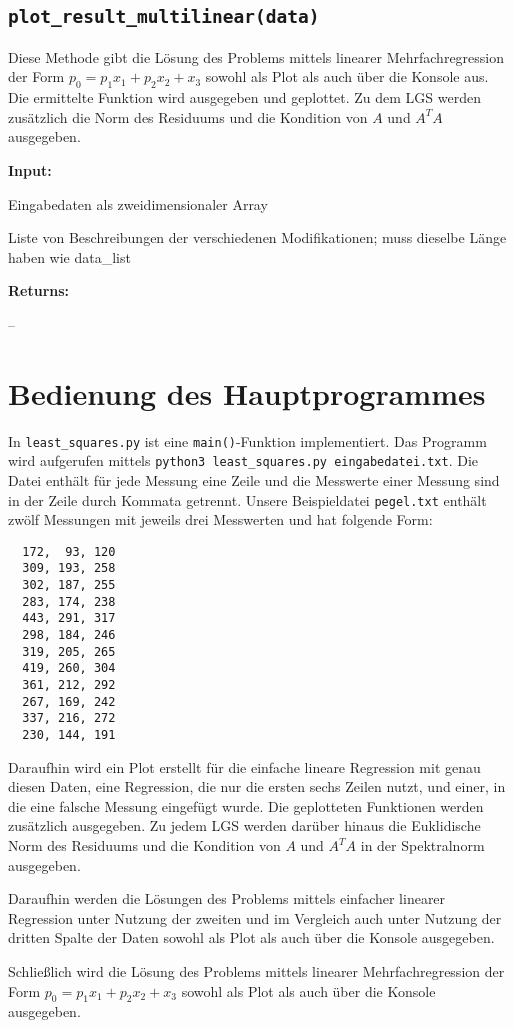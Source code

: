 \documentclass[smallheadings]{scrartcl}
\newcommand{\initem}[2]{\item[\hspace{0.5em} {\normalfont\ttfamily{#1}} {\normalfont\itshape{(#2)}}]}
\newcommand{\outitem}[1]{\item[\hspace{0.5em} \normalfont\itshape{(#1)}]}
\newcommand{\bfpara}[1]{\noindent \textbf{#1:}\,}
\begin{document}
\subsection{\texttt{plot\_result\_multilinear(data)}}
Diese Methode gibt die Lösung des Problems mittels linearer Mehrfachregression der Form $p_0 = p_1 x_1 +p_2 x_2+x_3$ sowohl als Plot als auch über die Konsole aus.
Die ermittelte Funktion wird ausgegeben und geplottet.
Zu dem LGS werden zusätzlich die Norm des Residuums und die Kondition von $A$ und $A^T A$ ausgegeben.

\bfpara{Input}
    \begin{compactdesc}
		    \initem{data}{2d-array} Eingabedaten als zweidimensionaler Array
		    \initem{labels}{list of strings} Liste von Beschreibungen der verschiedenen Modifikationen; muss dieselbe Länge haben wie data\_list
		\end{compactdesc}
\bfpara{Returns}
    \begin{compactdesc}
		  \outitem{None} --
	  \end{compactdesc}
\pagebreak 
\section{Bedienung des Hauptprogrammes}
In \texttt{least\_squares.py} ist eine \texttt{main()}-Funktion implementiert.
Das Programm wird aufgerufen mittels \texttt{python3 least\_squares.py eingabedatei.txt}.
Die Datei enthält für jede Messung eine Zeile und die Messwerte einer Messung sind in der Zeile durch Kommata getrennt.
Unsere Beispieldatei \texttt{pegel.txt} enthält zwölf Messungen mit jeweils drei Messwerten und hat folgende Form:

\begin{verbatim}
  172,  93, 120
  309, 193, 258
  302, 187, 255
  283, 174, 238
  443, 291, 317
  298, 184, 246
  319, 205, 265
  419, 260, 304
  361, 212, 292
  267, 169, 242
  337, 216, 272
  230, 144, 191
\end{verbatim}

Daraufhin wird ein Plot erstellt für die einfache lineare Regression mit genau diesen Daten, eine Regression, die nur die ersten sechs Zeilen nutzt, und einer, in die eine falsche Messung eingefügt wurde.
Die geplotteten Funktionen werden zusätzlich ausgegeben.
Zu jedem LGS werden darüber hinaus die Euklidische Norm des Residuums und die Kondition von $A$ und $A^T A$ in der Spektralnorm ausgegeben.

Daraufhin werden die Lösungen des Problems mittels einfacher linearer Regression unter Nutzung der zweiten und im Vergleich auch unter Nutzung der dritten Spalte der Daten sowohl als Plot als auch über die Konsole ausgegeben.

Schließlich wird die Lösung des Problems mittels linearer Mehrfachregression der Form $p_0 = p_1 x_1 +p_2 x_2+x_3$ sowohl als Plot als auch über die Konsole ausgegeben.
\end{document}
